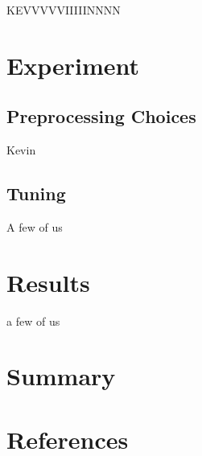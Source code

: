 \documentclass[twoside,11pt]{article}
\begin{document}
KEVVVVVIIIIINNNN

\section{Experiment}

\subsection{Preprocessing Choices}

Kevin

\subsection{Tuning}

A few of us

\section{Results}

a few of us

\section{Summary}



\section{References}
\end{document}
